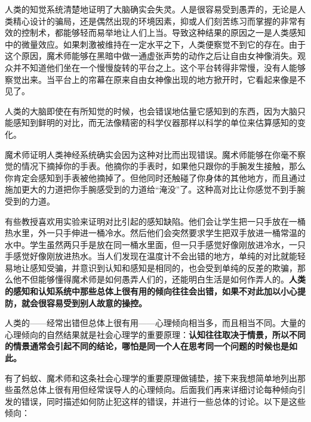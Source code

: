 人类的知觉系统清楚地证明了大脑确实会失灵。人是很容易受到愚弄的，无论是人类精心设计的骗局，还是偶然出现的环境因素，抑或人们刻苦练习而掌握的非常有效的控制术，都能够轻而易举地让人们上当。导致这种结果的原因之一是人类感知中的微量效应。如果刺激被维持在一定水平之下，人类便察觉不到它的存在。由于这个原因，魔术师能够在黑暗中做一通虚张声势的动作之后让自由女神像消失。观众并不知道他们坐在一个慢慢旋转的平台之上。这个平台转得非常慢，没有人能够察觉出来。当平台上的帘幕在原来自由女神像出现的地方掀开时，它看起来像是不见了。
\par

人类的大脑即使在有所知觉的时候，也会错误地估量它感知到的东西，因为大脑只能感知到鲜明的对比，而无法像精密的科学仪器那样以科学的单位来估算感知的变化。
\par

魔术师证明人类神经系统确实会因为这种对比而出现错误。魔术师能够在你毫不察觉的情况下摘掉你的手表。他摘你的手表时，如果他只跟你的手腕发生接触，那么你肯定会感知到手表被他摘掉了。但他同时还触碰了你身体的其他地方，而且通过施加更大的力道把你手腕感受到的力道给“淹没”了。这种高对比让你感觉不到手腕受到的力道。
\par

有些教授喜欢用实验来证明对比引起的感知缺陷。他们会让学生把一只手放在一桶热水里，外一只手伸进一桶冷水。然后他们会突然要求学生把双手放进一桶常温的水中。学生虽然两只手是放在同一桶水里面，但一只手感觉好像刚放进冷水，一只手感觉好像刚放进热水。当人们发现在温度计不会出错的地方，单纯的对比就能轻易地让感知受骗，并意识到认知和感知是相同的，也会受到单纯的反差的欺骗，那么他不但能够懂得魔术师是如何愚弄人们的，还能明白生活是如何作弄人的。\textbf{人类的感知和认知系统中那些总体上很有用的倾向往往会出错，如果不对此加以小心提防，就会很容易受到别人故意的操控。}
\par

人类的——经常出错但总体上很有用——心理倾向相当多，而且相当不同。大量的心理倾向的自然结果就是社会心理学的重要原理：\textbf{认知往往取决于情景，所以不同的情景通常会引起不同的结论，哪怕是同一个人在思考同一个问题的时候也是如此。}
\par

有了蚂蚁、魔术师和这条社会心理学的重要原理做铺垫，接下来我想简单地列出那些虽然总体上很有用但经常误导人的心理倾向。后面我们再来详细讨论每种倾向引发的错误，同时描述如何防止犯这样的错误，并进行一些总体的讨论。以下是这些倾向：
\par

